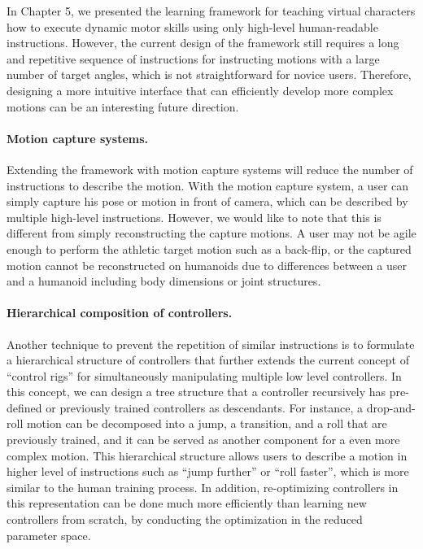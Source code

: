 In Chapter 5, we presented the learning framework for teaching
virtual characters how to execute dynamic motor skills using only high-level
human-readable instructions. 
However, the current design of the framework still requires a long and
repetitive sequence of instructions for instructing motions with a large 
number of target angles, which is not straightforward for novice users. 
Therefore, designing a more intuitive interface that can efficiently develop
more complex motions can be an interesting future direction.

\paragraph{Motion capture systems.}
Extending the framework with motion capture systems will reduce the number of
instructions to describe the motion.
With the motion capture system, a user can simply capture his pose or motion in
front of camera, which can be described by multiple high-level instructions.
However, we would like to note that this is different from simply
reconstructing the capture motions.
A user may not be agile enough to perform the athletic target motion 
such as a back-flip, or the captured motion cannot be reconstructed on 
humanoids due to differences between a user and a humanoid including body
dimensions or joint structures.

\paragraph{Hierarchical composition of controllers.}
Another technique to prevent the repetition of similar instructions is to
formulate a hierarchical structure of controllers that further extends the
current concept of ``control rigs'' for simultaneously manipulating multiple
low level controllers.
In this concept, we can design a tree structure that a controller recursively
has pre-defined or previously trained controllers as descendants.
For instance, a drop-and-roll motion can be decomposed into a jump, a
transition, and a roll that are previously trained, and
it can be served as another component for a even more complex motion.
This hierarchical structure allows users to describe a motion in higher level
of instructions such as ``jump further'' or ``roll faster'', which is more
similar to the human training process. 
In addition, re-optimizing controllers in this representation can be done much
more efficiently than learning new controllers from scratch, by conducting the
optimization in the reduced parameter space.

